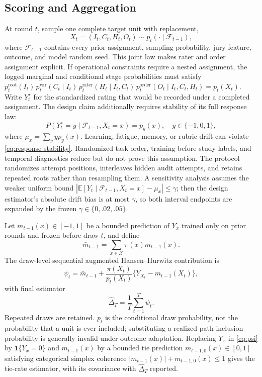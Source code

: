 \documentclass{article}
\begin{document}
\subsection{Scoring and Aggregation}

At round $t$, sample one complete target unit with replacement,
\begin{equation}
X_t=(I_t,C_t,H_t,O_t)\sim
p_t(\cdot\mid\mathcal F_{t-1}),
\end{equation}
where $\mathcal F_{t-1}$ contains every prior assignment, sampling
probability, jury feature, outcome, and model random seed. This joint law makes
rater and order assignment explicit. If operational constraints require a
nested assignment, the logged marginal and conditional stage probabilities
must satisfy
$p_t^{\mathrm{root}}(I_t)\,p_t^{\mathrm{var}}(C_t\mid I_t)\,
p_t^{\mathrm{rater}}(H_t\mid I_t,C_t)\,
p_t^{\mathrm{order}}(O_t\mid I_t,C_t,H_t)=p_t(X_t)$.
Write $Y_t^\star$ for the standardized rating that would be recorded under a
completed assignment. The design claim additionally requires stability of its
full response law:
\begin{equation}
P(Y_t^\star=y\mid\mathcal F_{t-1},X_t=x)=p_y(x),
\quad y\in\{-1,0,1\},
\label{eq:response-stability}
\end{equation}
where $\mu_x=\sum_yyp_y(x)$.
Learning, fatigue, memory, or rubric drift can violate
\cref{eq:response-stability}. Randomized task order, training before study
labels, and temporal diagnostics reduce but do not prove this assumption.
The protocol randomizes attempt positions, interleaves hidden audit attempts,
and retains repeated roots rather than resampling them. A sensitivity analysis
assumes the weaker uniform bound
$|\mathbb E[Y_t\mid\mathcal F_{t-1},X_t=x]-\mu_x|\le\gamma$;
then the design estimator's absolute drift bias is at most $\gamma$, so both
interval endpoints are expanded by the frozen $\gamma\in\{0,.02,.05\}$.

Let $m_{t-1}(x)\in[-1,1]$ be a bounded prediction of $Y_x$ trained only on
prior rounds and frozen before draw $t$, and define
\begin{equation}
\bar m_{t-1}=\sum_{x\in\mathcal X}\pi(x)m_{t-1}(x).
\end{equation}
The draw-level sequential augmented Hansen--Hurwitz contribution is
\begin{equation}
\psi_t=\bar m_{t-1}+
\frac{\pi(X_t)}{p_t(X_t)}
\{Y_{X_t}-m_{t-1}(X_t)\},
\label{eq:psi}
\end{equation}
with final estimator
\begin{equation}
\widehat\Delta_T=\frac1T\sum_{t=1}^T\psi_t.
\label{eq:estimator}
\end{equation}
Repeated draws are retained. $p_t$ is the conditional draw probability, not
the probability that a unit is ever included; substituting a realized-path
inclusion probability is generally invalid under outcome adaptation. Replacing
$Y_x$ in \cref{eq:psi} by $\mathbf{1}\{Y_x=0\}$ and $m_{t-1}(x)$ by a bounded
tie prediction $m_{t-1,0}(x)\in[0,1]$ satisfying categorical simplex coherence
$|m_{t-1}(x)|+m_{t-1,0}(x)\le1$ gives the tie-rate estimator,
with its covariance with $\widehat\Delta_T$ reported.
\end{document}
